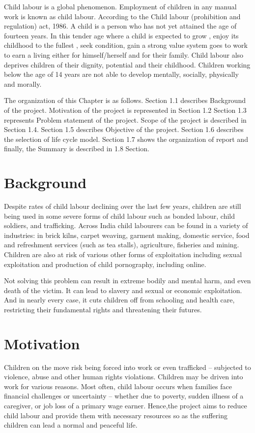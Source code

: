 Child labour is a global phenomenon. Employment of children in any manual work is known as child labour. According to the Child labour (prohibition and regulation) act, 1986. A child is a person who has not yet attained the age of fourteen years. In this tender age where a child is expected to grow , enjoy its childhood to the fullest , seek condition, gain a strong value system goes to work to earn a living either for himself/herself and for their family. Child labour also deprives children of their dignity, potential and their childhood. Children working below the age of 14 years are not able to develop mentally, socially, physically and morally.

The organization of this Chapter is as follows. Section 1.1 describes Background of the project. Motivation of the project is represented in Section 1.2 Section 1.3 represents Problem statement of the project. Scope of the project is described in Section 1.4. Section 1.5 describes Objective of the project. Section 1.6 describes the selection of life cycle model. Section 1.7 shows the organization of report and finally, the Summary is described in 1.8 Section.

\section{Background}
Despite rates of child labour declining over the last few years, children are still being used in some severe forms of child labour such as bonded labour, child soldiers, and trafficking. Across India child labourers can be found in a variety of industries: in brick kilns, carpet weaving, garment making, domestic service, food and refreshment services (such as tea stalls), agriculture, fisheries and mining. Children are also at risk of various other forms of exploitation including sexual exploitation and production of child pornography, including online.

Not solving this problem can result in extreme bodily and mental harm, and even death of the victim. It can lead to slavery and sexual or economic exploitation. And in nearly every case, it cuts children off from schooling and health care, restricting their fundamental rights and threatening their futures.              


\section{Motivation}
Children on the move risk being forced into work or even trafficked – subjected to violence, abuse and other human rights violations. Children may be driven into work for various reasons. Most often, child labour occurs when families face financial challenges or uncertainty – whether due to poverty, sudden illness of a caregiver, or job loss of a primary wage earner. Hence,the project aims to reduce child labour and provide them with necessary resources so as the suffering children can lead a normal and peaceful life.

